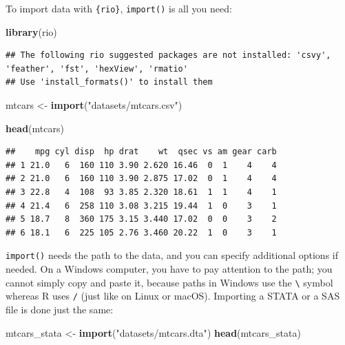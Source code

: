 \documentclass[]{gitbook}
\newenvironment{Shaded}{\begin{snugshade}}{\end{snugshade}}
\newcommand{\KeywordTok}[1]{\textcolor[rgb]{0.13,0.29,0.53}{\textbf{#1}}}
\newcommand{\NormalTok}[1]{#1}
\newcommand{\StringTok}[1]{\textcolor[rgb]{0.31,0.60,0.02}{#1}}
\begin{document}
To import data with \texttt{\{rio\}}, \texttt{import()} is all you need:

\begin{Shaded}
\begin{Highlighting}[]
\KeywordTok{library}\NormalTok{(rio)}
\end{Highlighting}
\end{Shaded}

\begin{verbatim}
## The following rio suggested packages are not installed: 'csvy', 'feather', 'fst', 'hexView', 'rmatio'
## Use 'install_formats()' to install them
\end{verbatim}

\begin{Shaded}
\begin{Highlighting}[]
\NormalTok{mtcars <-}\StringTok{ }\KeywordTok{import}\NormalTok{(}\StringTok{"datasets/mtcars.csv"}\NormalTok{)}
\end{Highlighting}
\end{Shaded}

\begin{Shaded}
\begin{Highlighting}[]
\KeywordTok{head}\NormalTok{(mtcars)}
\end{Highlighting}
\end{Shaded}

\begin{verbatim}
##    mpg cyl disp  hp drat    wt  qsec vs am gear carb
## 1 21.0   6  160 110 3.90 2.620 16.46  0  1    4    4
## 2 21.0   6  160 110 3.90 2.875 17.02  0  1    4    4
## 3 22.8   4  108  93 3.85 2.320 18.61  1  1    4    1
## 4 21.4   6  258 110 3.08 3.215 19.44  1  0    3    1
## 5 18.7   8  360 175 3.15 3.440 17.02  0  0    3    2
## 6 18.1   6  225 105 2.76 3.460 20.22  1  0    3    1
\end{verbatim}

\texttt{import()} needs the path to the data, and you can specify additional options if needed. On a
Windows computer, you have to pay attention to the path; you cannot simply copy and paste it, because
paths in Windows use the \texttt{\textbackslash{}} symbol whereas R uses \texttt{/} (just like on Linux or macOS).
Importing a STATA or a SAS file is done just the same:

\begin{Shaded}
\begin{Highlighting}[]
\NormalTok{mtcars_stata <-}\StringTok{ }\KeywordTok{import}\NormalTok{(}\StringTok{"datasets/mtcars.dta"}\NormalTok{)}
\KeywordTok{head}\NormalTok{(mtcars_stata)}
\end{Highlighting}
\end{Shaded}
\end{document}
